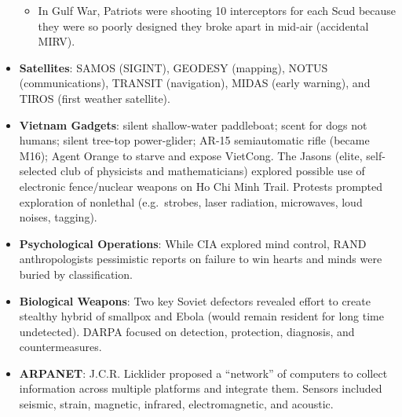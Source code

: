 \documentclass[
]{article}
\providecommand{\tightlist}{%
  \setlength{\itemsep}{0pt}\setlength{\parskip}{0pt}}
\begin{document}
\begin{itemize}
  \begin{itemize}
  \tightlist
  \item
    In Gulf War, Patriots were shooting 10 interceptors for each Scud
    because they were so poorly designed they broke apart in mid-air
    (accidental MIRV).
  \end{itemize}
\item
  \textbf{Satellites}: SAMOS (SIGINT), GEODESY (mapping), NOTUS
  (communications), TRANSIT (navigation), MIDAS (early warning), and
  TIROS (first weather satellite).
\item
  \textbf{Vietnam Gadgets}: silent shallow-water paddleboat; scent for
  dogs not humans; silent tree-top power-glider; AR-15 semiautomatic
  rifle (became M16); Agent Orange to starve and expose VietCong. The
  Jasons (elite, self-selected club of physicists and mathematicians)
  explored possible use of electronic fence/nuclear weapons on Ho Chi
  Minh Trail. Protests prompted exploration of nonlethal (e.g.~strobes,
  laser radiation, microwaves, loud noises, tagging).
\item
  \textbf{Psychological Operations}: While CIA explored mind control,
  RAND anthropologists pessimistic reports on failure to win hearts and
  minds were buried by classification.
\item
  \textbf{Biological Weapons}: Two key Soviet defectors revealed effort
  to create stealthy hybrid of smallpox and Ebola (would remain resident
  for long time undetected). DARPA focused on detection, protection,
  diagnosis, and countermeasures.
\item
  \textbf{ARPANET}: J.C.R. Licklider proposed a ``network'' of computers
  to collect information across multiple platforms and integrate them.
  Sensors included seismic, strain, magnetic, infrared, electromagnetic,
  and acoustic.


\end{itemize}
\end{document}
